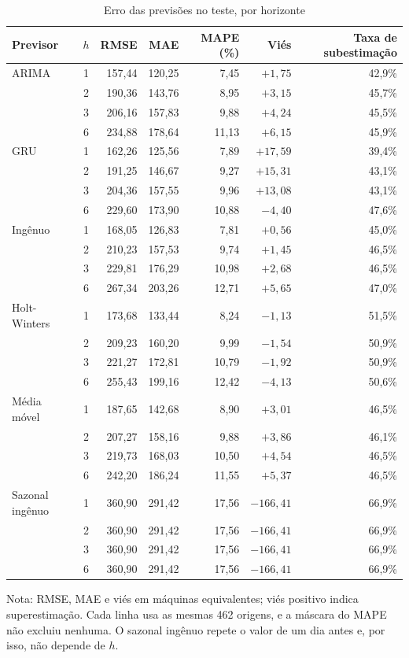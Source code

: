 \begin{table}[htbp]
\centering
\caption{Erro das previsões no teste, por horizonte}
\label{tab:erro-horizonte-test}
\footnotesize
\begin{tabular}{lcrrrrr}
\toprule
\textbf{Previsor} & $h$ & \textbf{RMSE} & \textbf{MAE} & \textbf{MAPE (\%)} & \textbf{Viés} & \textbf{Taxa de subestimação} \\
\midrule
ARIMA & 1 & 157,44 & 120,25 & 7,45 & $+1{,}75$ & 42,9\% \\
 & 2 & 190,36 & 143,76 & 8,95 & $+3{,}15$ & 45,7\% \\
 & 3 & 206,16 & 157,83 & 9,88 & $+4{,}24$ & 45,5\% \\
 & 6 & 234,88 & 178,64 & 11,13 & $+6{,}15$ & 45,9\% \\
\addlinespace
GRU & 1 & 162,26 & 125,56 & 7,89 & $+17{,}59$ & 39,4\% \\
 & 2 & 191,25 & 146,67 & 9,27 & $+15{,}31$ & 43,1\% \\
 & 3 & 204,36 & 157,55 & 9,96 & $+13{,}08$ & 43,1\% \\
 & 6 & 229,60 & 173,90 & 10,88 & $-4{,}40$ & 47,6\% \\
\addlinespace
Ingênuo & 1 & 168,05 & 126,83 & 7,81 & $+0{,}56$ & 45,0\% \\
 & 2 & 210,23 & 157,53 & 9,74 & $+1{,}45$ & 46,5\% \\
 & 3 & 229,81 & 176,29 & 10,98 & $+2{,}68$ & 46,5\% \\
 & 6 & 267,34 & 203,26 & 12,71 & $+5{,}65$ & 47,0\% \\
\addlinespace
Holt-Winters & 1 & 173,68 & 133,44 & 8,24 & $-1{,}13$ & 51,5\% \\
 & 2 & 209,23 & 160,20 & 9,99 & $-1{,}54$ & 50,9\% \\
 & 3 & 221,27 & 172,81 & 10,79 & $-1{,}92$ & 50,9\% \\
 & 6 & 255,43 & 199,16 & 12,42 & $-4{,}13$ & 50,6\% \\
\addlinespace
Média móvel & 1 & 187,65 & 142,68 & 8,90 & $+3{,}01$ & 46,5\% \\
 & 2 & 207,27 & 158,16 & 9,88 & $+3{,}86$ & 46,1\% \\
 & 3 & 219,73 & 168,03 & 10,50 & $+4{,}54$ & 46,5\% \\
 & 6 & 242,20 & 186,24 & 11,55 & $+5{,}37$ & 46,5\% \\
\addlinespace
Sazonal ingênuo & 1 & 360,90 & 291,42 & 17,56 & $-166{,}41$ & 66,9\% \\
 & 2 & 360,90 & 291,42 & 17,56 & $-166{,}41$ & 66,9\% \\
 & 3 & 360,90 & 291,42 & 17,56 & $-166{,}41$ & 66,9\% \\
 & 6 & 360,90 & 291,42 & 17,56 & $-166{,}41$ & 66,9\% \\
\bottomrule
\end{tabular}

\smallskip
\parbox{\textwidth}{\footnotesize Nota: RMSE, MAE e viés em máquinas equivalentes; viés positivo indica superestimação. Cada linha usa as mesmas 462 origens, e a máscara do MAPE não excluiu nenhuma. O sazonal ingênuo repete o valor de um dia antes e, por isso, não depende de $h$.}
\end{table}
